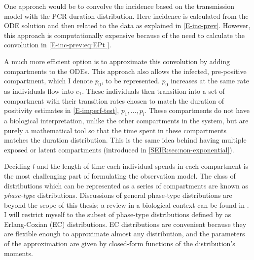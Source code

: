 \documentclass[thesis.tex]{subfiles}
\begin{document}
One approach would be to convolve the incidence based on the transmission model with the PCR duration distribution.
Here incidence is calculated from the ODE solution and then related to the data as explained in \cref{E-inc-prev}.
However, this approach is computationally expensive because of the need to calculate the convolution in \cref{E-inc-prev:eq:EPt }.

A much more efficient option is to approximate this convolution by adding compartments to the ODEs.
This approach also allows the infected, pre-positive compartment, which I denote $p_0$, to be represented.
$p_0$ increases at the same rate as individuals flow into $e_1$.
These individuals then transition into a set of compartment with their transition rates chosen to match the duration of positivity estimates in \cref{E-imperf-test}, $p_1, \dots, p_l$.
These compartments do not have a biological interpretation, unlike the other compartments in the system, but are purely a mathematical tool so that the time spent in these compartments matches the duration distribution.
This is the same idea behind having multiple exposed or latent compartments (introduced in \cref{SEIR:sec:non-exponential}).

Deciding $l$ and the length of time each individual spends in each compartment is the most challenging part of formulating the observation model.
The class of distributions which can be represented as a series of compartments are known as \emph{phase-type} distributions.
Discussions of general phase-type distributions are beyond the scope of this thesis; a review in a biological context can be found in \textcite{hobolthPhasetype}.
I will restrict myself to the subset of phase-type distributions defined by \textcite{osogamiClosed} as Erlang-Coxian (EC) distributions.
EC distributions are convenient because they are flexible enough to approximate almost any distribution, and the parameters of the approximation are given by closed-form functions of the distribution's moments.
\end{document}
